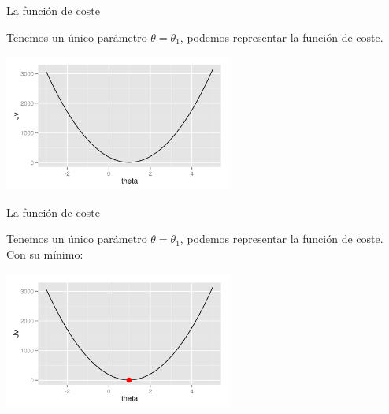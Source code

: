 \documentclass[aspectratio=169]{beamer}
\begin{document}
\begin{frame}{La función de coste}
  \begin{overlayarea}{\textwidth}{\textheight}
    Tenemos un único parámetro $\theta=\theta_1$, podemos representar
    la función de coste.\\
    \vphantom{Con su mínimo}
    \begin{center}
      
  \includegraphics[height=4.5cm]{funcionccosterectaorigen.png}
\end{center}
\end{overlayarea}
\end{frame}
\begin{frame}{La función de coste}
    \begin{overlayarea}{\textwidth}{\textheight}
Tenemos un único parámetro $\theta=\theta_1$, podemos representar la
función de coste.\\
Con su mínimo:
\begin{center}
  \includegraphics[height=4.5cm]{funcionccosterectaorigen_con_min.png}
\end{center}
\end{overlayarea}
\end{frame}
\end{document}
